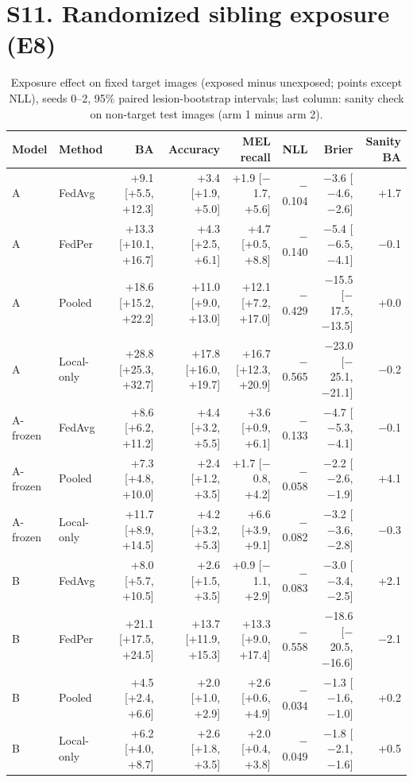 \documentclass[10pt]{article}
\begin{document}
\section*{S11. Randomized sibling exposure (E8)}
\begin{table}[!htbp]
\centering
\scriptsize
\caption{Exposure effect on fixed target images (exposed minus unexposed; points except NLL), seeds 0--2, 95\% paired lesion-bootstrap intervals; last column: sanity check on non-target test images (arm 1 minus arm 2).}
\label{tab:s11}
\begin{tabular}{@{}llrrrrrr@{}}
\toprule
Model & Method & BA & Accuracy & MEL recall & NLL & Brier & Sanity BA \\
\midrule
A & FedAvg & +9.1 [+5.5, +12.3] & +3.4 [+1.9, +5.0] & +1.9 [$-$1.7, +5.6] & $-$0.104 & $-$3.6 [$-$4.6, $-$2.6] & +1.7 \\
A & FedPer & +13.3 [+10.1, +16.7] & +4.3 [+2.5, +6.1] & +4.7 [+0.5, +8.8] & $-$0.140 & $-$5.4 [$-$6.5, $-$4.1] & $-$0.1 \\
A & Pooled & +18.6 [+15.2, +22.2] & +11.0 [+9.0, +13.0] & +12.1 [+7.2, +17.0] & $-$0.429 & $-$15.5 [$-$17.5, $-$13.5] & +0.0 \\
A & Local-only & +28.8 [+25.3, +32.7] & +17.8 [+16.0, +19.7] & +16.7 [+12.3, +20.9] & $-$0.565 & $-$23.0 [$-$25.1, $-$21.1] & $-$0.2 \\
A-frozen & FedAvg & +8.6 [+6.2, +11.2] & +4.4 [+3.2, +5.5] & +3.6 [+0.9, +6.1] & $-$0.133 & $-$4.7 [$-$5.3, $-$4.1] & $-$0.1 \\
A-frozen & Pooled & +7.3 [+4.8, +10.0] & +2.4 [+1.2, +3.5] & +1.7 [$-$0.8, +4.2] & $-$0.058 & $-$2.2 [$-$2.6, $-$1.9] & +4.1 \\
A-frozen & Local-only & +11.7 [+8.9, +14.5] & +4.2 [+3.2, +5.3] & +6.6 [+3.9, +9.1] & $-$0.082 & $-$3.2 [$-$3.6, $-$2.8] & $-$0.3 \\
B & FedAvg & +8.0 [+5.7, +10.5] & +2.6 [+1.5, +3.5] & +0.9 [$-$1.1, +2.9] & $-$0.083 & $-$3.0 [$-$3.4, $-$2.5] & +2.1 \\
B & FedPer & +21.1 [+17.5, +24.5] & +13.7 [+11.9, +15.3] & +13.3 [+9.0, +17.4] & $-$0.558 & $-$18.6 [$-$20.5, $-$16.6] & $-$2.1 \\
B & Pooled & +4.5 [+2.4, +6.6] & +2.0 [+1.0, +2.9] & +2.6 [+0.6, +4.9] & $-$0.034 & $-$1.3 [$-$1.6, $-$1.0] & +0.2 \\
B & Local-only & +6.2 [+4.0, +8.7] & +2.6 [+1.8, +3.5] & +2.0 [+0.4, +3.8] & $-$0.049 & $-$1.8 [$-$2.1, $-$1.6] & +0.5 \\
\bottomrule
\end{tabular}
\end{table}
\end{document}

